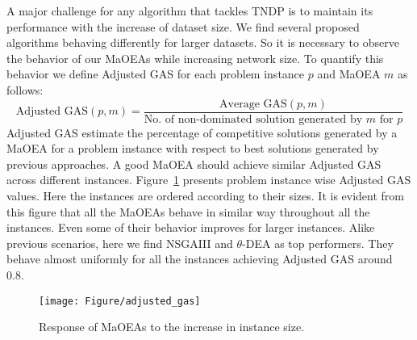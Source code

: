 A major challenge for any algorithm that tackles TNDP is to maintain its performance with the increase of dataset size.  We find several proposed algorithms behaving differently for larger datasets. So it is necessary to observe the behavior of our MaOEAs while increasing network size.  To quantify this behavior we define Adjusted GAS for each problem instance $p$ and MaOEA $m$ as follows:
\begin{equation}
\text{Adjusted GAS}(p, m)  = \frac{ \text{Average GAS}(p, m) }{ \text{No. of non-dominated solution generated by } m \text{ for } p }
	\label{eq:adjusted_gas}
\end{equation}
Adjusted GAS estimate the percentage of competitive solutions generated by a MaOEA for a problem instance with respect to best solutions generated by previous approaches. A good MaOEA should achieve similar Adjusted GAS across different instances. Figure~\ref{fig:adjusted_gas} presents problem instance wise Adjusted GAS values. Here the instances are ordered according to their sizes. It is evident from this figure that all the MaOEAs behave in similar way throughout all the instances. Even some of their behavior improves for larger instances. Alike previous scenarios, here we find NSGAIII and $\theta$-DEA as top performers. They behave almost uniformly for all the instances achieving Adjusted GAS around 0.8.
\begin{figure} [!htbp]
	\centering
	\texttt{[image: Figure/adjusted\_gas]}\\
	\caption{Response of MaOEAs to the increase in instance size.}\label{fig:adjusted_gas} 
\end{figure}
%

